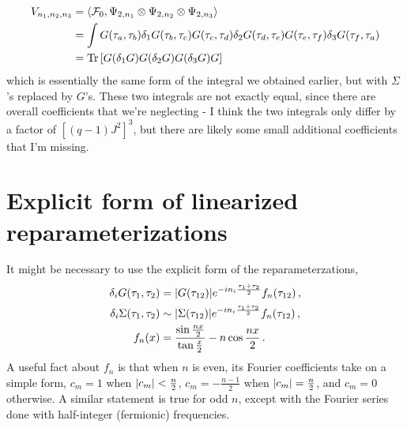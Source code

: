\documentclass[aps,prx,preprint,onecolumn,citeautoscript,footinbib]{revtex4-1}
\begin{document}
\begin{equation}
    \begin{aligned}
    V_{n_1, n_2, n_3} &= \langle \mathcal{F}_0,  \Psi_{2, n_1} \otimes \Psi_{2, n_2} \otimes \Psi_{2, n_3} \rangle
    \\
    &= \int G(\tau_a, \tau_b) \delta_1 G(\tau_b, \tau_c) G(\tau_c, \tau_d) \delta_2 G(\tau_d, \tau_e) G(\tau_e, \tau_f) \delta_3 G(\tau_f, \tau_a) 
    \\
    &= \Tr\left[G (\delta_1 G) G (\delta_2 G) G (\delta_3 G)G \right]
    \end{aligned}
\end{equation}
which is essentially the same form of the integral we obtained earlier, but with $\Sigma$'s replaced by $G$'s. These two integrals are not exactly equal, since there are overall coefficients that we're neglecting - I think the two integrals only differ by a factor of $\left[(q-1)J^2\right]^3$, but there are likely some small additional coefficients that I'm missing.
\appendix
\section{Explicit form of linearized reparameterizations}
It might be necessary to use the explicit form of the reparameterzations,
\begin{equation}
\begin{aligned}
    \delta_i G(\tau_1, \tau_2) &= \abs{G(\tau_{12})} e^{-in_i \frac{\tau_1 + \tau_2}{2}} f_n(\tau_{12})\,,
    \\
    \delta_i \Sigma(\tau_1, \tau_2) &\sim  \abs{\Sigma(\tau_{12})} e^{-in_i \frac{\tau_1 + \tau_2}{2}} f_n(\tau_{12})\,,
    \\
    f_n(x) &= \frac{\sin\frac{nx}{2}}{\tan \frac{x}{2}} - n \cos \frac{nx}{2}\,.
    \end{aligned}
\end{equation}
A useful fact about $f_n$ is that when $n$ is even, its Fourier coefficients take on a simple form, $c_m = 1$ when $\abs{c_m} < \frac{n}{2}$, $c_m = -\frac{n-1}{2}$ when $\abs{c_m} = \frac{n}{2}$, and $c_m = 0$ otherwise. A similar statement is true for odd $n$, except with the Fourier series done with half-integer (fermionic) frequencies.
\end{document}

